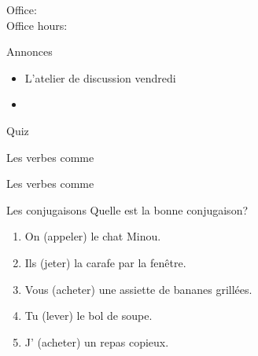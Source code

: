 \documentclass{beamer}
\subtitle[Repas et verbes (\lexi{acheter} et \lexi{appeler})]{Les repas et les verbes comme \lexi{acheter} et \lexi{appeler}}
\begin{document}
  \begin{frame}
    \titlepage
    \tiny{Office: \\
          Office hours: }
  \end{frame}

  \begin{frame}{Annonces}
    \begin{itemize}
      \item L'atelier de discussion vendredi
      \item[] 
    \end{itemize}
  \end{frame}

  \begin{frame}{}
    \begin{center}
      \Large Quiz
    \end{center}
  \end{frame}

  \begin{frame}{Les verbes comme }
    \begin{center}
      
    \end{center}
  \end{frame}

  \begin{frame}{Les verbes comme }
    \begin{center}
      
    \end{center}
  \end{frame}

  \begin{frame}{Les conjugaisons}
    Quelle est la bonne conjugaison? \\
    \begin{enumerate}
      \item On \underline{} (appeler) le chat Minou.
      \item Ils \underline{} (jeter) la carafe par la fenêtre.
      \item Vous \underline{} (acheter) une assiette de bananes grillées.
      \item Tu \underline{} (lever) le bol de soupe.
      \item J'\underline{} (acheter) un repas copieux.
    \end{enumerate}
  \end{frame}
\end{document}
